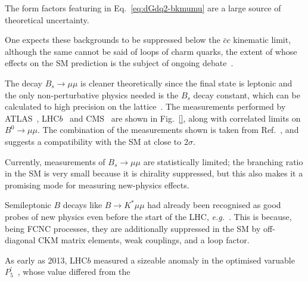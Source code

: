 The form factors featuring in Eq.~\eqref{eq:dGdq2-bkmumu} are a large source of
theoretical uncertainty.

One expects these backgrounds to be suppressed below the
$\bar{c}c$ kinematic limit, although the same cannot be said of loops of charm
quarks, the extent of whose effects on the SM prediction is the subject of
ongoing debate~\cite{}.


The decay $B_{s} \to \mu \mu$ is cleaner theoretically since the final state is
leptonic and the only non-perturbative physics needed is the $B_{s}$ decay
constant, which can be calculated to high precision on the lattice~\cite{}. The
measurements performed by ATLAS~\cite{Aaboud:2018mst},
LHC$b$~\cite{Aaij:2012nna, Aaij:2017vad} and CMS~\cite{CMS-PAS-BPH-16-004} are shown in
Fig.~\ref{}, along with correlated limits on $B^{0}\to \mu\mu$. The combination
of the measurements shown is taken from Ref.~\cite{}, and suggests a
compatibility with the SM at close to $2\sigma$.


Currently, measurements of $B_{s} \to \mu\mu$ are statistically limited; the
branching ratio in the SM is very small because it is chirality suppressed, but
this also makes it a promising mode for measuring new-physics effects.

Semileptonic $B$ decays like $B \to K^{*} \mu\mu$ had already been recognised as
good probes of new physics even before the start of the LHC,
\textit{e.g.}~\cite{Kruger:1999xa}. This is because, being FCNC processes, they
are additionally suppressed in the SM by off-diagonal CKM matrix elements, weak
couplings, and a loop factor.

As early as 2013, LHC$b$ measured a sizeable anomaly in the optimised varuable
$P_{5}^{\prime}$~\cite{}, whose value differed from the




